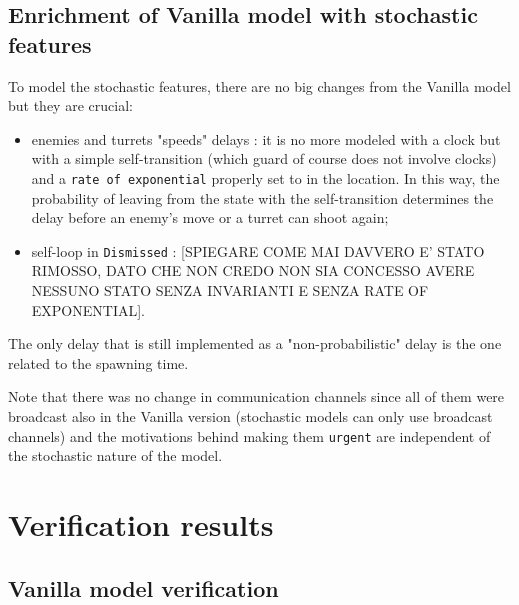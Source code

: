 \documentclass[
10pt, %
a4paper, %
oneside, %
headinclude,footinclude, %
BCOR5mm, %
]{scrartcl}
\begin{document}
		\subsection{Enrichment of Vanilla model with stochastic features}
			To model the stochastic features, there are no big changes from the Vanilla model but they are crucial:
			\begin{itemize}
				\item enemies and turrets "speeds" delays : it is no more modeled with a clock but with a simple self-transition (which guard of course does not involve clocks) and a \texttt{rate of exponential} properly set to in the location. In this way, the probability of leaving from the state with the self-transition determines the delay before an enemy's move or a turret can shoot again;
				\item self-loop in \texttt{Dismissed} : [SPIEGARE COME MAI DAVVERO E' STATO RIMOSSO, DATO CHE NON CREDO NON SIA CONCESSO AVERE NESSUNO STATO SENZA INVARIANTI E SENZA RATE OF EXPONENTIAL].
			\end{itemize}
			The only delay that is still implemented as a "non-probabilistic" delay is the one related to the spawning time.
			
			Note that there was no change in communication channels since all of them were broadcast also in the Vanilla version (stochastic models can only use broadcast channels) and the motivations behind making them \texttt{urgent} are independent of the stochastic nature of the model.
	\section{Verification results}
		\subsection{Vanilla model verification}
\end{document}
